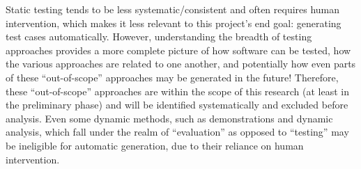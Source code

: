 Static testing tends to be less
systematic/consistent and often requires human intervention, which makes it
less relevant to this project's end goal: generating test cases automatically.
However, understanding the breadth of testing approaches provides a more
complete picture of how software can be tested, how the various approaches are
related to one another, and potentially how even parts of these ``out-of-scope''
approaches may be generated in the future! Therefore, these ``out-of-scope''
approaches are within the scope of this research (at least in the preliminary
phase) and will be identified systematically and excluded before analysis. Even
some dynamic methods, such as demonstrations and dynamic analysis, which fall
under the realm of ``evaluation'' as opposed to ``testing''
\citep[p.~13]{Firesmith2015} may be ineligible for automatic generation, due
to their reliance on human intervention.